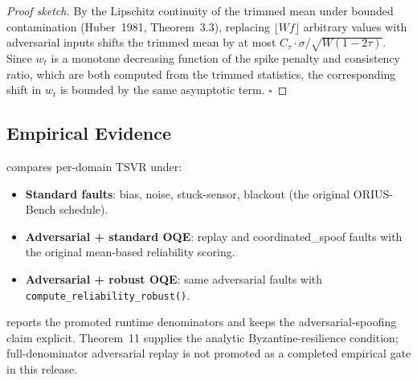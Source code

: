 \begin{proof}[Proof sketch]
By the Lipschitz continuity of the trimmed mean under bounded contamination
(Huber~1981, Theorem~3.3), replacing $\lfloor Wf \rfloor$ arbitrary values
with adversarial inputs shifts the trimmed mean by at most
$C_\tau \cdot \sigma / \sqrt{W(1-2\tau)}$.
Since $w_t$ is a monotone decreasing function of the spike penalty and
consistency ratio, which are both computed from the trimmed statistics,
the corresponding shift in $w_t$ is bounded by the same asymptotic term.
$\square$
\end{proof}

\subsection{Empirical Evidence}

 compares per-domain TSVR under:
\begin{itemize}
  \item \textbf{Standard faults}: bias, noise, stuck-sensor, blackout
        (the original ORIUS-Bench schedule).
  \item \textbf{Adversarial + standard OQE}: replay and coordinated\_spoof
        faults with the original mean-based reliability scoring.
  \item \textbf{Adversarial + robust OQE}: same adversarial faults with
        \texttt{compute\_reliability\_robust()}.
\end{itemize}

 reports the promoted runtime denominators and keeps
the adversarial-spoofing claim explicit.  Theorem~11 supplies the analytic
Byzantine-resilience condition; full-denominator adversarial replay is not
promoted as a completed empirical gate in this release.



